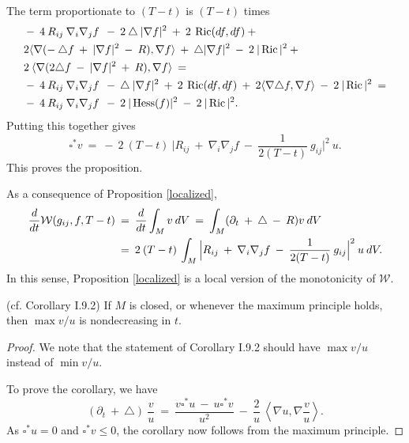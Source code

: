 The term proportionate to $(T-t)$ is $(T-t)$ times
\begin{align}
& - \: 4 \: R_{ij} \: \nabla_i \nabla_j f \: \: - \:
2 \: \triangle \: |\nabla f|^2 \: + \: 2 \:
\operatorname{Ric}(df, df) \: + \\
&  2 \langle \nabla
(- \: \triangle f \: + \: |\nabla f|^2 \: - \: R),
\nabla f \rangle \: + \:
\triangle |\nabla f|^2  \: - \: 2 \: |\operatorname{Ric}|^2 \: + \notag \\
& 2 \: \langle \nabla
(2 \triangle f \: - \: |\nabla f|^2 \: + \: R),
\nabla f \rangle \: = \notag \\
&- \: 4 \: R_{ij} \: \nabla_i \nabla_j f \: \: - \:
\triangle \: |\nabla f|^2 \: + \: 2 \:
\operatorname{Ric}(df, df) \: + \:  2 \langle \nabla \triangle f,
\nabla f \rangle \: - \: 2 \: |\operatorname{Ric}|^2 \: = \notag \\
&- \: 4 \: R_{ij} \: \nabla_i \nabla_j f \: \: - \:
2 \: |\operatorname{Hess}(f)|^2 \: - \: 2 \: |\operatorname{Ric}|^2. \notag
\end{align}
Putting this together gives
\begin{equation}
\square^* v \: = \: - \: 2 \: (T-t) \:
\Big|R_{ij} \: + \: \nabla_i \nabla_j f \: - \: \frac{1}{2(T-t)} \: g_{ij}
\Big|^2 \: u.
\end{equation}
This proves the proposition.
\endgroup\par\medskip

As a consequence of Proposition \ref{localized},
\begin{align}
\frac{d}{dt} {\mathcal W}(g_{ij}, f, T-t) \: & = \:
\frac{d}{dt} \int_M v \: dV \: = \:
\int_M (\partial_t \: + \: \triangle \: - \: R)v \: dV \\
& = \: 2 \: (T-t) \: \int_M
\Big|R_{ij} \: + \: \nabla_i \nabla_j f \: - \: \frac{1}{2(T-t)} \: g_{ij}
\Big|^2 \: u \: dV. \notag
\end{align}
In this sense, Proposition \ref{localized} is a local version of
the monotonicity of ${\mathcal W}$.

\begin{corollary}
  \label{cor:kl-perelman-s-differential-harnack-inequality-monotonicity-harnack-inequalities}
 (cf. Corollary I.9.2) \label{whenever}
If $M$ is closed, or whenever the maximum principle holds, then
$\max v/u$ is nondecreasing in $t$.
\end{corollary}
\begin{proof}
We note that the statement of Corollary I.9.2
should have $\max v/u$ instead of
$\min v/u$.

To prove the corollary, we have
\begin{equation}
(\partial_t \: + \: \triangle) \: \frac{v}{u} \: = \:
\frac{v \square^* u \: - \: u \square^* v}{u^2} \: - \:
\frac{2}{u} \: \left\langle \nabla u, \nabla \frac{v}{u}
\right\rangle.
\end{equation}
As $\square^* u = 0$ and $\square^* v \le 0$,
the corollary now follows from the maximum principle.
\end{proof}


